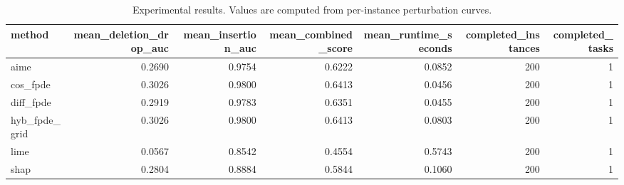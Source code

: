 \begin{table}[t]
\caption{Experimental results. Values are computed from per-instance perturbation curves.}
\label{tab:main_results_computed}
\centering
\begin{tabular}{lrrrrrr}
\toprule
method & mean\_deletion\_drop\_auc & mean\_insertion\_auc & mean\_combined\_score & mean\_runtime\_seconds & completed\_instances & completed\_tasks \\
\midrule
aime & 0.2690 & 0.9754 & 0.6222 & 0.0852 & 200 & 1 \\
cos\_fpde & 0.3026 & 0.9800 & 0.6413 & 0.0456 & 200 & 1 \\
diff\_fpde & 0.2919 & 0.9783 & 0.6351 & 0.0455 & 200 & 1 \\
hyb\_fpde\_grid & 0.3026 & 0.9800 & 0.6413 & 0.0803 & 200 & 1 \\
lime & 0.0567 & 0.8542 & 0.4554 & 0.5743 & 200 & 1 \\
shap & 0.2804 & 0.8884 & 0.5844 & 0.1060 & 200 & 1 \\
\bottomrule
\end{tabular}

\end{table}
